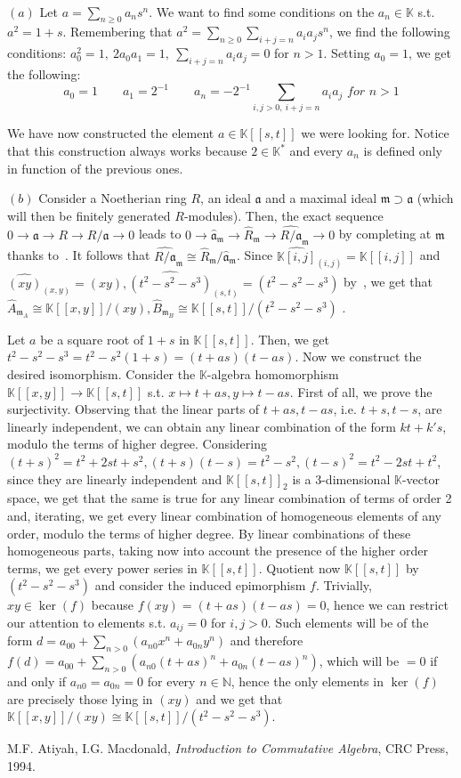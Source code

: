 \documentclass{article}
\newcommand{\numberset}{\mathbb}
\newcommand{\N}{\numberset{N}}
\newcommand{\K}{\numberset{K}}
\newcommand{\mi}{\mathfrak{m}}
\newcommand{\exercise}[1]{\noindent {\bf Exercise #1}}
\begin{document}
~\\
\exercise{2}

$(a)$ Let $a=\sum_{n\geq 0} a_ns^n$. We want to find some conditions on the $a_n\in\K$ s.t. $a^2=1+s$. Remembering that $a^2=\sum_{n\geq 0}\sum_{i+j=n} a_ia_js^n$, we find the following conditions: $a_0^2=1,\ 2a_0a_1=1,\ \sum_{i+j=n} a_ia_j=0$ for $n>1$. Setting $a_0=1$, we get the following:
$$  
  a_0=1 \quad\quad a_1=2^{-1} \quad\quad a_n=-2^{-1}\sum_{i,j>0,\ i+j=n} a_ia_j\textit{ for }n>1
$$

We have now constructed the element $a\in\K[[s,t]]$ we were looking for. Notice that this construction always works because $2\in\K^*$ and every $a_n$ is defined only in function of the previous ones.

$(b)$ Consider a Noetherian ring $R$, an ideal $\mathfrak{a}$ and a maximal ideal $\mi\supset\mathfrak{a}$ (which will then be finitely generated $R$-modules). Then, the exact sequence $0\rightarrow\mathfrak{a}\rightarrow R\rightarrow R/\mathfrak{a}\rightarrow 0$ leads to $0\rightarrow\hat{\mathfrak{a}}_{\mi}\rightarrow\hat{R}_{\mi}\rightarrow \widehat{R/\mathfrak{a}}_{\mi}\rightarrow 0$ by completing at $\mi$ thanks to~\cite[prop. 10.12]{atm}. It follows that $\widehat{R/\mathfrak{a}}_{\mi}\cong\hat{R}_{\mi}/\hat{\mathfrak{a}}_{\mi}$. Since $\widehat{\K[i,j]}_{(i,j)}=\K[[i,j]]$ and $\widehat{(xy)}_{(x,y)}=(xy),\widehat{(t^2-s^2-s^3)}_{(s,t)}=(t^2-s^2-s^3)$ by~\cite[prop. 10.13]{atm}, we get that $\hat{A}_{\mi_A}\cong\K[[x,y]]/(xy),\hat{B}_{\mi_B}\cong\K[[s,t]]/(t^2-s^2-s^3)$ .

Let $a$ be a square root of $1+s$ in $\K[[s,t]]$. Then, we get $t^2-s^2-s^3=t^2-s^2(1+s)=(t+as)(t-as)$. Now we construct the desired isomorphism. Consider the $\K$-algebra homomorphism $\K[[x,y]]\rightarrow\K[[s,t]]$ s.t. $x\mapsto t+as,y\mapsto t-as$. First of all, we prove the surjectivity. Observing that the linear parts of $t+as,t-as$, i.e. $t+s,t-s$, are linearly independent, we can obtain any linear combination of the form $kt+k's$, modulo the terms of higher degree. Considering $(t+s)^2=t^2+2st+s^2,(t+s)(t-s)=t^2-s^2,(t-s)^2=t^2-2st+t^2$, since they are linearly independent and $\K[[s,t]]_2$ is a $3$-dimensional $\K$-vector space, we get that the same is true for any linear combination of terms of order 2 and, iterating, we get every linear combination of homogeneous elements of any order, modulo the terms of higher degree. By linear combinations of these homogeneous parts, taking now into account the presence of the higher order terms, we get every power series in $\K[[s,t]]$. Quotient now $\K[[s,t]]$ by $(t^2-s^2-s^3)$ and consider the induced epimorphism $f$. Trivially, $xy\in\ker(f)$ because $f(xy)=(t+as)(t-as)=0$, hence we can restrict our attention to elements s.t. $a_{ij}=0$ for $i,j>0$. Such elements will be of the form $d=a_{00}+\sum_{n>0} (a_{n0}x^n+a_{0n}y^n)$ and therefore $f(d)=a_{00}+\sum_{n>0}(a_{n0}(t+as)^n+a_{0n}(t-as)^n)$, which will be $=0$ if and only if $a_{n0}=a_{0n}=0$ for every $n\in\N$, hence the only elements in $\ker(f)$ are precisely those lying in $(xy)$ and we get that $\K[[x,y]]/(xy)\cong\K[[s,t]]/(t^2-s^2-s^3)$.


\begin{thebibliography}{9}
		M.F. Atiyah, I.G. Macdonald,
		\textit{Introduction to Commutative Algebra},
		CRC Press,
		1994.
\end{thebibliography}
\end{document}
